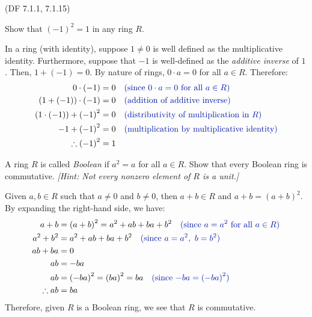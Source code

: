 \begin{problem}{(\textsf{DF 7.1.1, 7.1.15})}
  \begin{enumalph}
    \item Show that ${(-1)}^2=1$ in any ring $R$.
      \begin{Answer}
        In a ring (with identity), suppose $1 \neq 0$ is well defined
        as the multiplicative identity.
        Furthermore, suppose that $-1$ is well-defined as the \emph{additive inverse}
        of $1$.
        Then, $1 + (-1) = 0$.
        By nature of rings, $0 \cdot a = 0$ for all $a \in R$. Therefore:
        \begin{align*}
          0 \cdot (-1) &= 0 \quad \zaff{\text{(since $0 \cdot a = 0$ for all $a \in R$)}}\\
          (1 + (-1)) \cdot (-1) &= 0 \quad \zaff{\text{(addition of additive inverse)}} \\
          (1 \cdot (-1)) + {(-1)}^2 &= 0 \quad \zaff{\text{(distributivity of multiplication in $R$)}}\\
          -1 + {(-1)}^2 &= 0 \quad \zaff{\text{(multiplication by multiplicative identity)}} \\
          \therefore {(-1)}^2 &= 1
        \end{align*}
      \end{Answer}
    \newpage
    \item A ring $R$ is called \emph{Boolean} if $a^2=a$ for all $a \in R$.  Show that 
    every Boolean ring is commutative.  \emph{[Hint: Not every nonzero element of $R$ 
    is a unit.]}
      \begin{Answer}
        Given $a, b \in R$ such that $a \neq 0$ and $b \neq 0$,
        then $a + b \in R$ and $a + b = {(a + b)}^2$.
        By expanding the right-hand side, we have:
        \begin{align*}
          a + b &= {(a + b)}^2 = a^2 + ab + ba + b^2 \quad \zaff{\text{(since $a = a^2$ for all $a \in R$)}} \\
          a^2 + b^2 &= a^2 + ab + ba + b^2 \quad \zaff{\text{(since $a = a^2,\ b = b^2$)}} \\
          ab + ba &= 0 \\
          ab &= -ba \\
          ab &= {(-ba)}^2 = {(ba)}^2 = ba \quad \zaff{\text{(since $-ba = {(-ba)}^2)$}}\\
          \therefore ab &= ba
        \end{align*}
        Therefore, given $R$ is a Boolean ring, we see that $R$ is commutative.
      \end{Answer}
  \end{enumalph}
\end{problem}
